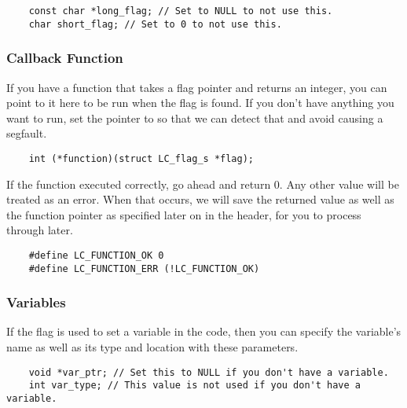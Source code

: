 \begin{verbatim}
	const char *long_flag; // Set to NULL to not use this.
	char short_flag; // Set to 0 to not use this.
\end{verbatim}

\subsubsection{Callback Function}

If you have a function that takes a flag pointer and returns an integer, you can point to it here to be run when the flag is found. If you don't have anything you want to run, set the pointer to  so that we can detect that and avoid causing a segfault.\footnotemark


\begin{verbatim}
	int (*function)(struct LC_flag_s *flag);
\end{verbatim}

If the function executed correctly, go ahead and return 0. Any other value will be treated as an error. When that occurs, we will save the returned value as well as the function pointer as specified later on in the header, for you to process through later.

\begin{verbatim}
	#define LC_FUNCTION_OK 0
	#define LC_FUNCTION_ERR (!LC_FUNCTION_OK)
\end{verbatim}

\subsubsection{Variables}
\label{sec:var-discussion}

If the flag is used to set a variable in the code, then you can specify the variable's name as well as its type and location with these parameters.

\begin{verbatim}
	void *var_ptr; // Set this to NULL if you don't have a variable.
	int var_type; // This value is not used if you don't have a variable.
\end{verbatim}

